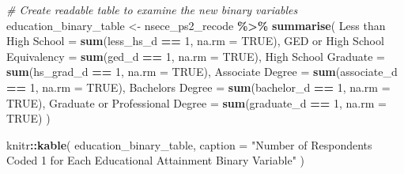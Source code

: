\documentclass[
]{article}
\newenvironment{Shaded}{\begin{snugshade}}{\end{snugshade}}
\newcommand{\AttributeTok}[1]{\textcolor[rgb]{0.13,0.29,0.53}{#1}}
\newcommand{\CommentTok}[1]{\textcolor[rgb]{0.56,0.35,0.01}{\textit{#1}}}
\newcommand{\ConstantTok}[1]{\textcolor[rgb]{0.56,0.35,0.01}{#1}}
\newcommand{\DecValTok}[1]{\textcolor[rgb]{0.00,0.00,0.81}{#1}}
\newcommand{\FunctionTok}[1]{\textcolor[rgb]{0.13,0.29,0.53}{\textbf{#1}}}
\newcommand{\NormalTok}[1]{#1}
\newcommand{\OtherTok}[1]{\textcolor[rgb]{0.56,0.35,0.01}{#1}}
\newcommand{\SpecialCharTok}[1]{\textcolor[rgb]{0.81,0.36,0.00}{\textbf{#1}}}
\newcommand{\StringTok}[1]{\textcolor[rgb]{0.31,0.60,0.02}{#1}}
\begin{document}
\begin{Shaded}
\begin{Highlighting}[]
\CommentTok{\# Create readable table to examine the new binary variables}
\NormalTok{education\_binary\_table }\OtherTok{\textless{}{-}}
\NormalTok{  nsece\_ps2\_recode }\SpecialCharTok{\%\textgreater{}\%}
  \FunctionTok{summarise}\NormalTok{(}
    \StringTok{\textasciigrave{}}\AttributeTok{Less than High School}\StringTok{\textasciigrave{}} \OtherTok{=} \FunctionTok{sum}\NormalTok{(less\_hs\_d }\SpecialCharTok{==} \DecValTok{1}\NormalTok{, }\AttributeTok{na.rm =} \ConstantTok{TRUE}\NormalTok{),}
    \StringTok{\textasciigrave{}}\AttributeTok{GED or High School Equivalency}\StringTok{\textasciigrave{}} \OtherTok{=} \FunctionTok{sum}\NormalTok{(ged\_d }\SpecialCharTok{==} \DecValTok{1}\NormalTok{, }\AttributeTok{na.rm =} \ConstantTok{TRUE}\NormalTok{),}
    \StringTok{\textasciigrave{}}\AttributeTok{High School Graduate}\StringTok{\textasciigrave{}} \OtherTok{=} \FunctionTok{sum}\NormalTok{(hs\_grad\_d }\SpecialCharTok{==} \DecValTok{1}\NormalTok{, }\AttributeTok{na.rm =} \ConstantTok{TRUE}\NormalTok{),}
    \StringTok{\textasciigrave{}}\AttributeTok{Associate Degree}\StringTok{\textasciigrave{}} \OtherTok{=} \FunctionTok{sum}\NormalTok{(associate\_d }\SpecialCharTok{==} \DecValTok{1}\NormalTok{, }\AttributeTok{na.rm =} \ConstantTok{TRUE}\NormalTok{),}
    \StringTok{\textasciigrave{}}\AttributeTok{Bachelor\textquotesingle{}s Degree}\StringTok{\textasciigrave{}} \OtherTok{=} \FunctionTok{sum}\NormalTok{(bachelor\_d }\SpecialCharTok{==} \DecValTok{1}\NormalTok{, }\AttributeTok{na.rm =} \ConstantTok{TRUE}\NormalTok{),}
    \StringTok{\textasciigrave{}}\AttributeTok{Graduate or Professional Degree}\StringTok{\textasciigrave{}} \OtherTok{=} \FunctionTok{sum}\NormalTok{(graduate\_d }\SpecialCharTok{==} \DecValTok{1}\NormalTok{, }\AttributeTok{na.rm =} \ConstantTok{TRUE}\NormalTok{)}
\NormalTok{  )}

\NormalTok{knitr}\SpecialCharTok{::}\FunctionTok{kable}\NormalTok{(}
\NormalTok{  education\_binary\_table,}
  \AttributeTok{caption =} \StringTok{"Number of Respondents Coded 1 for Each Educational Attainment Binary Variable"}
\NormalTok{)}
\end{Highlighting}
\end{Shaded}
\end{document}
